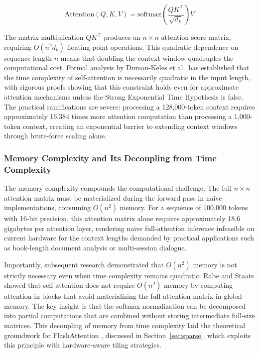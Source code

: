 \documentclass[11pt,letterpaper]{article}
\begin{document}
\begin{equation}
\text{Attention}(Q, K, V) = \text{softmax}\!\left(\frac{QK^\top}{\sqrt{d_k}}\right) V
\label{eq:attention}
\end{equation}

The matrix multiplication $QK^\top$ produces an $n \times n$ attention score matrix, requiring $O(n^2 d_k)$ floating-point operations. This quadratic dependence on sequence length $n$ means that doubling the context window quadruples the computational cost. Formal analysis by Duman-Keles et al.\ has established that the time complexity of self-attention is necessarily quadratic in the input length, with rigorous proofs showing that this constraint holds even for approximate attention mechanisms unless the Strong Exponential Time Hypothesis is false. The practical ramifications are severe: processing a 128,000-token context requires approximately 16,384 times more attention computation than processing a 1,000-token context, creating an exponential barrier to extending context windows through brute-force scaling alone.

\subsubsection{Memory Complexity and Its Decoupling from Time Complexity}

The memory complexity compounds the computational challenge. The full $n \times n$ attention matrix must be materialized during the forward pass in naive implementations, consuming $O(n^2)$ memory. For a sequence of 100,000 tokens with 16-bit precision, this attention matrix alone requires approximately 18.6 gigabytes per attention layer, rendering naive full-attention inference infeasible on current hardware for the context lengths demanded by practical applications such as book-length document analysis or multi-session dialogue.

Importantly, subsequent research demonstrated that $O(n^2)$ memory is not strictly necessary even when time complexity remains quadratic. Rabe and Staats showed that self-attention does not require $O(n^2)$ memory by computing attention in blocks that avoid materializing the full attention matrix in global memory. The key insight is that the softmax normalization can be decomposed into partial computations that are combined without storing intermediate full-size matrices. This decoupling of memory from time complexity laid the theoretical groundwork for FlashAttention \cite{dao2022flashattention}, discussed in Section~\ref{sec:sparse}, which exploits this principle with hardware-aware tiling strategies.
\end{document}

